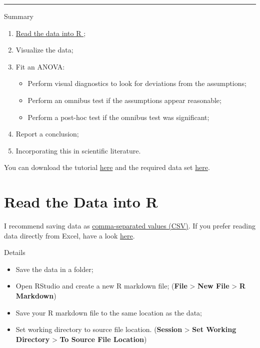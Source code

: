 \documentclass[
]{book}
\providecommand{\tightlist}{%
  \setlength{\itemsep}{0pt}\setlength{\parskip}{0pt}}
\begin{document}
\begin{center}\rule{0.5\linewidth}{0.5pt}\end{center}

Summary

\begin{enumerate}
\def\labelenumi{\arabic{enumi}.}
\tightlist
\item
  \href{https://youtu.be/BGUqZc-Pb8w}{Read the data into R };
\item
  Visualize the data;
\item
  Fit an ANOVA:

  \begin{itemize}
  \tightlist
  \item
    Perform visual diagnostics to look for deviations from the assumptions;
  \item
    Perform an omnibus test if the assumptions appear reasonable;
  \item
    Perform a post-hoc test if the omnibus test was significant;
  \end{itemize}
\item
  Report a conclusion;
\item
  Incorporating this in scientific literature.
\end{enumerate}

You can download the tutorial \href{files/tutorial_ANOVA.Rmd}{here} and the required data set \href{data/three-groups.csv}{here}.

\hypertarget{read-ANOVA}{%
\section{Read the Data into R}\label{read-ANOVA}}

I recommend saving data as \href{https://youtu.be/BGUqZc-Pb8w}{comma-separated values (CSV)}. If you prefer reading data directly from Excel, have a look \protect\hyperlink{Excel}{here}.

Details

\begin{itemize}
\tightlist
\item
  Save the data in a folder;
\item
  Open RStudio and create a new R markdown file; (\textbf{File} \textgreater{} \textbf{New File} \textgreater{} \textbf{R Markdown})
\item
  Save your R markdown file to the same location as the data;
\item
  Set working directory to source file location. (\textbf{Session} \textgreater{} \textbf{Set Working Directory} \textgreater{} \textbf{To Source File Location})
\end{itemize}
\end{document}
